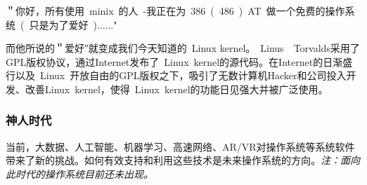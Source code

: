 ＂你好，所有使用 minix 的人 -我正在为 386 ( 486 ) AT 做一个免费的操作系统 ( 只是为了爱好 )......"

而他所说的＂爱好″就变成我们今天知道的 Linux kernel。 Linus　Torvalds采用了GPL版权协议，通过Internet发布了 Linux kernel的源代码。在Internet的日渐盛行以及 Linux 开放自由的GPL版权之下，吸引了无数计算机Hacker和公司投入开发、改善Linux kernel，使得 Linux kernel的功能日见强大并被广泛使用。 

\subsubsection{神人时代}

当前，大数据、人工智能、机器学习、高速网络、AR/VR对操作系统等系统软件带来了新的挑战。如何有效支持和利用这些技术是未来操作系统的方向。\emph{注：面向此时代的操作系统目前还未出现。}



